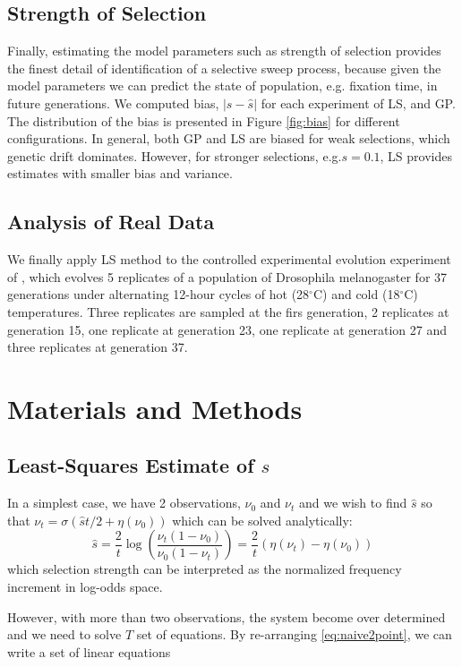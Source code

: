 \documentclass[11pt]{article}
\begin{document}
\subsection{Strength of  Selection}
Finally, estimating the model parameters such as strength of selection provides 
the finest detail of identification of a selective sweep process, because given 
the model parameters we can predict the state of population, e.g. fixation 
time, in future generations. We computed bias, $|s-\hat{s}|$ for each 
experiment of LS, and GP. The distribution of the bias is presented in Figure 
\ref{fig:bias} for different configurations. In general, both GP and  LS are 
biased for weak selections, which genetic drift dominates. However, for 
stronger selections, e.g.$s=0.1$, LS provides estimates with smaller bias and 
variance.

\subsection{Analysis of Real Data}
We finally apply LS method to the controlled experimental evolution experiment 
of \cite{orozco2012adaptation}, which evolves 5 replicates of a population of 
Drosophila melanogaster for 37 generations under alternating 12-hour cycles of 
hot (28$^{\circ}$C) and cold (18$^{\circ}$C) temperatures. Three replicates are 
sampled at the firs generation, 2 replicates at generation 15, one replicate at 
generation 23, one replicate at generation 27 and three replicates at 
generation 37.

\section{Materials and Methods}
\subsection{Least-Squares Estimate of $s$} 
\label{sec:regression}
In a simplest case, we have 2 observations, $\nu_0$ and $\nu_t$ and we wish to 
find 
$\hat{s}$ so that $\nu_t=\sigma(\hat{s}t/2+\eta(\nu_0))$ which can be solved 
analytically:
\begin{equation}
\hat{s}=\frac{2}{t} \log \left( \frac{\nu_t(1-\nu_0)}{\nu_0 (1-\nu_t)} \right) 
= 
\frac{2}{t}  \left( \eta(\nu_t)-\eta(\nu_0)\right)
\label{eq:naive2point}
\end{equation}
which selection strength can be interpreted as the normalized frequency 
increment in log-odds space.

However, with more than two observations, the system become over determined and 
we need to solve $T$ set of equations. By re-arranging 
\eqref{eq:naive2point}, we can write a set of linear equations
\end{document}
